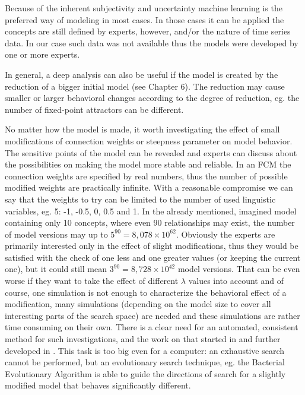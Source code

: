 \documentclass[graybox]{svmult}
\begin{document}
Because of the inherent subjectivity and uncertainty machine learning 
is the preferred way of modeling in most cases. In those cases it can be 
applied the concepts are still defined by experts, however, and/or the 
nature of time series data. In our case such data was not available 
thus the models were developed by one or more experts.

In general, a deep analysis can also be useful if the model is created 
by the reduction of a bigger initial model (see Chapter 6). The 
reduction may cause smaller or larger behavioral changes according to 
the degree of reduction, eg. the number of fixed-point attractors can 
be different.

No matter how the model is made, it worth investigating the effect 
of small modifications of connection weights or steepness parameter 
on model behavior. The sensitive points of the model can be revealed 
and experts can discuss about the possibilities on making the model 
more stable and reliable. In an FCM the connection 
weights are specified by real numbers, thus the number of possible 
modified weights are practically infinite. With a reasonable 
compromise we can say that the weights to try can be limited to the 
number of used linguistic variables, eg. 5: -1, -0.5, 0, 0.5 and 1. 
In the already mentioned, imagined model containing only 10 concepts, where 
even 90 relationships may exist, the number of model versions may up 
to $5^{90} = 8,078\times10^{62}$. Obviously the experts are primarily 
interested only in the effect of slight modifications, thus they 
would be satisfied with the check of one less and one greater values 
(or keeping the current one), but it could still mean $3^{90} = 
8,728\times10^{42}$ model versions. That can be even worse if they 
want to take the effect of different $\lambda$ values into account and 
of course, one simulation is not enough to characterize the behavioral 
effect of a modification, many simulations (depending on the model 
size to cover all interesting parts of the search space) are needed 
and these simulations are rather time consuming on their own. There is 
a clear need for an automated, consistent method for such 
investigations, and the work on that started in 
\cite{hatwagner2016uncertainty,hatwagner2017behavioral} and further 
developed in \cite{hatwagner2019banking,hatwagner2018improved}. This 
task is too big even for a computer: an exhaustive search cannot be 
performed, but an evolutionary search technique, eg. the Bacterial 
Evolutionary Algorithm is able to guide the directions of search for a 
slightly modified model that behaves significantly different.
\end{document}
